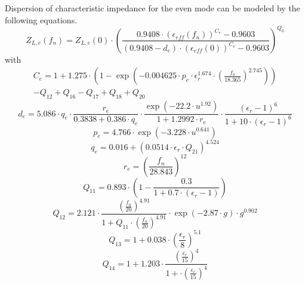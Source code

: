 \documentclass[10pt]{report}
\begin{document}
\addvspace{12pt}

Dispersion of characteristic impedance for the even mode can be
modeled by the following equations.
\begin{equation}
Z_{L,e}(f_n) = Z_{L,e}(0)\cdot \left( \frac{0.9408\cdot (\epsilon_{eff}(f_n))^{C_e} - 0.9603}
                        {(0.9408-d_e)\cdot (\epsilon_{eff}(0))^{C_e} - 0.9603} \right) ^{Q_0}
\end{equation}
with
\begin{equation}
\begin{split}
C_e = 1 + 1.275\cdot \left( 1-\exp\left( -0.004625\cdot p_e\cdot \epsilon_r^{1.674}\cdot
      \left( \frac{f_n}{18.365} \right) ^{2.745} \right) \right) \\
      - Q_{12}+Q_{16}-Q_{17}+Q_{18}+Q_{20}
\end{split}
\end{equation}
\begin{equation}
d_e = 5.086\cdot q_e\cdot\frac{r_e}{0.3838+0.386\cdot q_e}\cdot
      \frac{\exp\left(-22.2\cdot u^{1.92}\right)}{1+1.2992\cdot r_e}\cdot
      \frac{(\epsilon_r-1)^6}{1 + 10\cdot (\epsilon_r-1)^6}
\end{equation}
\begin{equation}
p_e = 4.766\cdot \exp (-3.228\cdot u^{0.641})
\end{equation}
\begin{equation}
q_e = 0.016 + (0.0514\cdot \epsilon_r\cdot Q_{21})^{4.524}
\end{equation}
\begin{equation}
r_e = \left( \frac{f_n}{28.843} \right) ^{12}
\end{equation}
\begin{equation}
Q_{11} = 0.893\cdot \left( 1 - \frac{0.3}{1+0.7\cdot(\epsilon_r-1)} \right)
\end{equation}
\begin{equation}
Q_{12} = 2.121\cdot \frac{\left( \frac{f_n}{20}\right) ^{4.91}}
                         {1+Q_{11}\cdot\left( \frac{f_n}{20}\right) ^{4.91}}
	      \cdot \exp(-2.87\cdot g)\cdot g^{0.902}
\end{equation}
\begin{equation}
Q_{13} = 1 + 0.038\cdot \left( \frac{\epsilon_r}{8} \right) ^{5.1}
\end{equation}
\begin{equation}
Q_{14} = 1 + 1.203\cdot \frac{ \left( \frac{\epsilon_r}{15} \right) ^4}
                             {1 + \cdot \left( \frac{\epsilon_r}{15} \right) ^4}
\end{equation}
\end{document}
